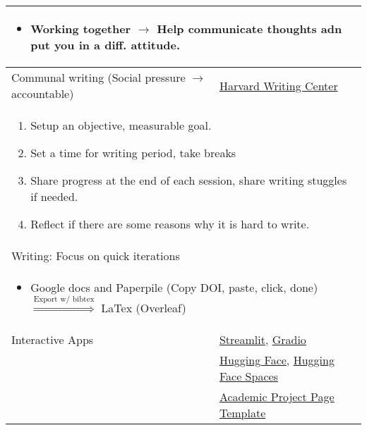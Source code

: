 \begin{summary}
\begin{center}
\begin{tabular}{ll}
            \multicolumn{2}{p{\linewidth}}{
            \begin{itemize}
                \item Working together $\rightarrow$ Help communicate thoughts adn put you in a diff. attitude.
            \end{itemize}}\\
            \midrule
            Communal writing (Social pressure $\rightarrow$ accountable) & \href{https://gsas.harvard.edu/academics/writing}{Harvard Writing Center} \\
            \multicolumn{2}{p{\linewidth}}{
            \begin{enumerate}
                \item Setup an objective, measurable goal. 
                \item Set a time for writing period, take breaks
                \item Share progress at the end of each session, share writing stuggles if needed.
                \item Reflect if there are some reasons why it is hard to write.
            \end{enumerate}}\\
            \midrule
            Writing: Focus on quick iterations & \\
            \multicolumn{2}{p{\linewidth}}{
            \begin{itemize}
                \item Google docs and Paperpile (Copy DOI, paste, click, done) $\overset{\text{Export w/ bibtex}}{\Longrightarrow}$ LaTex (Overleaf)
            \end{itemize}}\\
            \midrule
            Interactive Apps & \href{https://streamlit.io/}{Streamlit}, \href{https://www.gradio.app/}{Gradio} \\
            & \href{https://www.huggingface.co}{Hugging Face}, \href{https://www.hf.co/spaces}{Hugging Face Spaces} \\
            & \href{https://github.com/eliahuhorwitz/Academic-project-page-template}{Academic Project Page Template} \\
            \bottomrule
        \end{tabular}
    \end{center}
\end{summary}